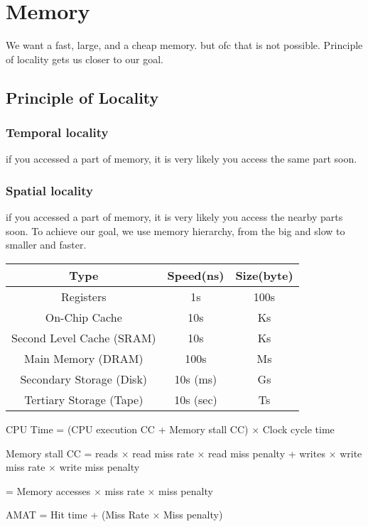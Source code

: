 \chapter{Memory}
We want a fast, large, and a cheap memory. but ofc that is not possible.
Principle of locality gets us closer to our goal.
\section{Principle of Locality}
\subsection{Temporal locality}
if you accessed a part of memory, it is very likely you access the same part soon.
\subsection{Spatial locality}
if you accessed a part of memory, it is very likely you access the nearby parts soon.
To achieve our goal, we use memory hierarchy, from the big and slow to smaller and faster.
\begin{center}
    \begin{tabular}{c|c|c}
        Type                      & Speed(ns) & Size(byte) \\ \hline
        Registers                 & 1s        & 100s       \\\hline
        On-Chip Cache             & 10s       & Ks         \\\hline
        Second Level Cache (SRAM) & 10s       & Ks         \\\hline
        Main Memory (DRAM)        & 100s      & Ms         \\\hline
        Secondary Storage (Disk)  & 10s (ms)  & Gs         \\\hline
        Tertiary Storage (Tape)   & 10s (sec) & Ts
    \end{tabular}
\end{center}

\begin{center}
    CPU Time = (CPU execution CC + Memory stall CC) \(\times\) Clock cycle time
\end{center}
\begin{center}
    Memory stall CC = reads \(\times\) read miss rate \(\times\) read miss penalty + writes \(\times\) write miss rate \(\times\) write miss penalty

    = Memory accesses \(\times\) miss rate \(\times\) miss penalty
\end{center}
\begin{center}
    AMAT = Hit time + (Miss Rate \(\times \) Miss penalty)
\end{center}
